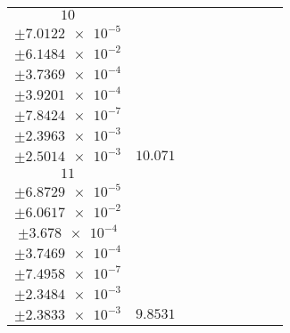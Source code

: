\documentclass[8pt]{article}
\begin{document}
\begin{longtable}[l]{c c c c c c c c c}
$\num{10}$ & \begin{tabular}[c]{@{}c@{}}$\num{6.4337e-2}$ \\ $\pm\num{7.0122e-5}$\end{tabular} & \begin{tabular}[c]{@{}c@{}}$\num{9.9313e-2}$ \\ $\pm\num{6.1484e-2}$\end{tabular} & \begin{tabular}[c]{@{}c@{}}$\num{-0.94695}$ \\ $\pm\num{3.7369e-4}$\end{tabular} & \begin{tabular}[c]{@{}c@{}}$\num{1.98e+3}$ \\ $\pm\num{3.9201e-4}$\end{tabular} & \begin{tabular}[c]{@{}c@{}}$\num{3.961}$ \\ $\pm\num{7.8424e-7}$\end{tabular} & \begin{tabular}[c]{@{}c@{}}$\num{1.9841}$ \\ $\pm\num{2.3963e-3}$\end{tabular} & \begin{tabular}[c]{@{}c@{}}$\num{2.0168}$ \\ $\pm\num{2.5014e-3}$\end{tabular} & $\num{10.071}$\\
$\num{11}$ & \begin{tabular}[c]{@{}c@{}}$\num{6.4162e-2}$ \\ $\pm\num{6.8729e-5}$\end{tabular} & \begin{tabular}[c]{@{}c@{}}$\num{-0.15774}$ \\ $\pm\num{6.0617e-2}$\end{tabular} & \begin{tabular}[c]{@{}c@{}}$\num{0.94753}$ \\ $\pm\num{3.678e-4}$\end{tabular} & \begin{tabular}[c]{@{}c@{}}$\num{1.9819e+3}$ \\ $\pm\num{3.7469e-4}$\end{tabular} & \begin{tabular}[c]{@{}c@{}}$\num{3.9648}$ \\ $\pm\num{7.4958e-7}$\end{tabular} & \begin{tabular}[c]{@{}c@{}}$\num{1.981}$ \\ $\pm\num{2.3484e-3}$\end{tabular} & \begin{tabular}[c]{@{}c@{}}$\num{1.9449}$ \\ $\pm\num{2.3833e-3}$\end{tabular} & $\num{9.8531}$\\

\end{longtable}
\end{document}
